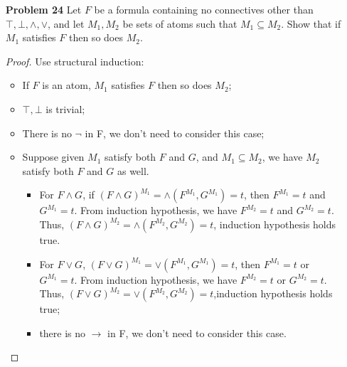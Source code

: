 \begin{enumerate}
\item[\textbf{Problem 24}] Let $F$ be a formula containing no connectives other than $\top, \bot, \wedge, \vee$, and let $M_1, M_2$ be sets of atoms such that $M_1 \subseteq M_2$. Show that if $M_1$ satisfies $F$ then so does $M_2$. 

\begin{proof} Use structural induction: 
\begin{itemize}
\item If $F$ is an atom, $M_1$ satisfies $F$ then so does $M_2$;
\item $\top, \bot$ is trivial;
\item There is no $\neg$ in F, we don't need to consider this case;
\item Suppose given $M_1$ satisfy both $F$ and $G$, and $M_1 \subseteq M_2$, we have $M_2$ satisfy both $F$ and $G$ as well. 
    \begin{itemize}
        \item For $F \wedge G$, if $(F \wedge G)^{M_1} = \wedge (F^{M_1}, G^{M_1}) = t$, then $F^{M_1} = t$ and $G^{M_1} = t$. From induction hypothesis, we have $F^{M_2} = t$ and $G^{M_2} = t$. Thus, $(F \wedge G)^{M_2} = \wedge (F^{M_2}, G^{M_2}) = t$, induction hypothesis holds true. 
        \item For $F \vee G$, $(F \vee G)^{M_1} = \vee (F^{M_1}, G^{M_1}) = t$, then $F^{M_1} = t$ or $G^{M_1} = t$. From induction hypothesis, we have $F^{M_2} = t$ or $G^{M_2} = t$. Thus, $(F \vee G)^{M_2} = \vee (F^{M_2}, G^{M_2}) = t$,induction hypothesis holds true;
        \item there is no $\rightarrow$ in F, we don't need to consider this case. 
    \end{itemize}
\end{itemize}
\end{proof}


\end{enumerate}

